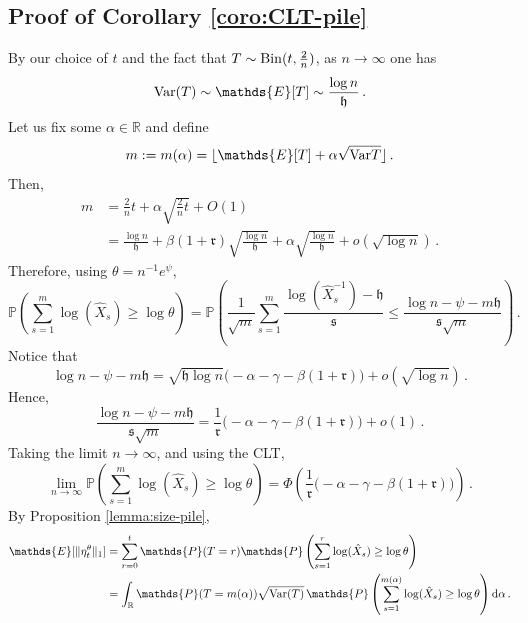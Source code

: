 \documentclass[11pt,reqno]{amsart}
\theoremstyle{remark}
\theoremstyle{definition}
\numberwithin{equation}{section}
\numberwithin{figure}{section}
\newcommand{\E}{\mathds{E}}
\renewcommand{\P}{\mathds{P}}
\newcommand{\R}{\mathbb{R}}
\newcommand{\var}{{\rm Var}}
\begin{document}
\subsection{Proof of Corollary \ref{coro:CLT-pile}}
			By our choice of $t$ and the fact that $T\sim{\rm Bin}(t,\frac2n)$,  as $n\to\infty$ one has
		\begin{equation}
		\label{eq:poire}
			\var(T)\sim \E[T]\sim \frac{\log n}{ \mathfrak{h}}\,.
		\end{equation}
		Let us fix some $\alpha\in\R$ and define 
		\begin{equation}
				m:=m(\alpha)=\lfloor \E[T]+\alpha\sqrt{\var T} \rfloor\,.
		\end{equation}
		Then, 
			\begin{align}
			m&=\frac2n t+\alpha\sqrt{\frac2n t}+O(1)\\
			&=\frac{\log n}{\mathfrak h}+\beta\left(1+\mathfrak r\right)\sqrt{\frac{\log n}{\mathfrak h}}+\alpha\sqrt{\frac{\log n}{\mathfrak h}}+o\left(\sqrt{\log n}\right)\,.
		\end{align}	 
		Therefore, using $\theta=n^{-1}e^\psi$, \begin{equation}
			\P\left(\sum_{s=1}^m\log(\hat X_s)\ge\log \theta\right)=\P\left(\frac1{\sqrt m}\sum_{s=1}^m \frac{\log(\hat X_s^{-1})-\mathfrak h}{\mathfrak s}\le \frac{\log n -\psi -m \mathfrak h}{\mathfrak s \sqrt{m}}\right)\,.
		\end{equation}
		Notice that
		\begin{equation}
			\log n -\psi -m \mathfrak h=\sqrt{\mathfrak h\log n}\big(-\alpha-\gamma-\beta(1+\mathfrak r) \big)+o(\sqrt{\log n})\,.
		\end{equation}
		Hence, 
			\begin{equation}
			\frac{\log n -\psi -m \mathfrak h}{\mathfrak s \sqrt m}=\frac{1}{\mathfrak r}\big(-\alpha-\gamma-\beta(1+\mathfrak r) \big)+o(1)\,.
		\end{equation}
	Taking the limit $n\to\infty$, and using the CLT, 
		\begin{equation}
				\lim_{n\to\infty}\P\left(\sum_{s=1}^m\log(\hat X_s)\ge\log \theta\right)=\Phi\left(\frac{1}{\mathfrak r}\big(-\alpha-\gamma-\beta(1+\mathfrak r) \big) \right)\,.
		\end{equation}
		By Proposition \ref{lemma:size-pile},
		\begin{equation}
			\begin{split}
			\E[\|\eta^\theta_t\|_1]&=\sum_{r=0}^{t}\P(T=r)	\P\left(\sum_{s=1}^r\log(\hat X_s)\ge\log \theta\right)\\
			&=\int_{\R}\P(T=m(\alpha))\sqrt{\var(T)}\,\P\left(\sum_{s=1}^{m(\alpha)}\log(\hat X_s)\ge\log \theta\right){\rm d}\alpha\,.
			\end{split}
		\end{equation}
\end{document}
